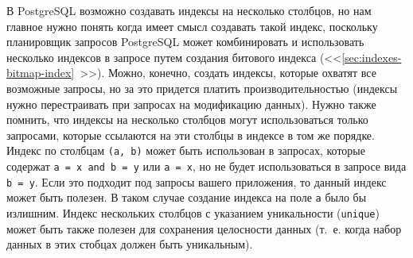 В PostgreSQL возможно создавать индексы на несколько столбцов, но нам главное нужно понять когда имеет смысл создавать такой индекс, поскольку планировщик запросов PostgreSQL может комбинировать и использовать несколько индексов в запросе путем создания битового индекса (<<\ref{sec:indexes-bitmap-index}~>>). Можно, конечно, создать индексы, которые охватят все возможные запросы, но за это придется платить производительностью (индексы нужно перестраивать при запросах на модификацию данных). Нужно также помнить, что индексы на несколько столбцов могут использоваться только запросами, которые ссылаются на эти столбцы в индексе в том же порядке. Индекс по столбцам \lstinline!(a, b)! может быть использован в запросах, которые содержат \lstinline!a = x and b = y! или \lstinline!a = x!, но не будет использоваться в запросе вида \lstinline!b = y!. Если это подходит под запросы вашего приложения, то данный индекс может быть полезен. В таком случае создание индекса на поле \lstinline!a! было бы излишним. Индекс нескольких столбцов с указанием уникальности (\lstinline!unique!) может быть также полезен для сохранения целосности данных (т.~е. когда набор данных в этих стобцах должен быть уникальным).
